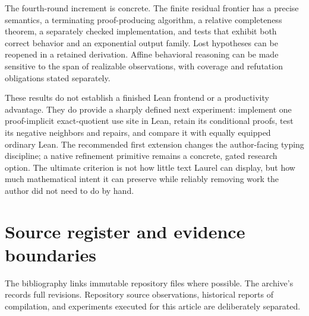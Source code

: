 \documentclass[11pt,a4paper]{article}
\newcommand{\code}[1]{\texttt{\detokenize{#1}}}
\theoremstyle{definition}
\theoremstyle{remark}
\begin{document}
The fourth-round increment is concrete. The finite residual frontier has a precise semantics, a terminating proof-producing algorithm, a relative completeness theorem, a separately checked implementation, and tests that exhibit both correct behavior and an exponential output family. Lost hypotheses can be reopened in a retained derivation. Affine behavioral reasoning can be made sensitive to the span of realizable observations, with coverage and refutation obligations stated separately.

These results do not establish a finished Lean frontend or a productivity advantage. They do provide a sharply defined next experiment: implement one proof-implicit exact-quotient use site in Lean, retain its conditional proofs, test its negative neighbors and repairs, and compare it with equally equipped ordinary Lean. The recommended first extension changes the author-facing typing discipline; a native refinement primitive remains a concrete, gated research option. The ultimate criterion is not how little text Laurel can display, but how much mathematical intent it can preserve while reliably removing work the author did not need to do by hand.

\clearpage
\appendix
\section{Source register and evidence boundaries}\label{app:sources}
The bibliography links immutable repository files where possible. The archive's \code{sources.json} records full revisions. Repository source observations, historical reports of compilation, and experiments executed for this article are deliberately separated.
\end{document}
